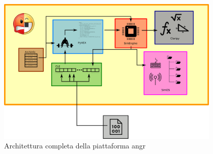 \documentclass[../main.tex]{subfiles}
\begin{document}
\begin{figure}[H]
    \centering
    \includegraphics[width = 0.95\textwidth]{../images/angr_diagram.png}
    \caption{Architettura completa della piattaforma angr}
\end{figure}
\end{document}
